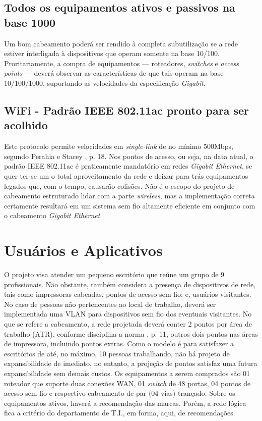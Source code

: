 \documentclass[	DIV=calc,%
							paper=a4,%
							fontsize=12pt,%
							onecolumn]{scrartcl}	 					%
\begin{document}
\subsection{Todos os equipamentos ativos e passivos na base 1000}
Um bom cabeamento poderá ser rendido à completa subutilização se a rede estiver interligada à dispositivos que operam somente na base 10/100. Proritariamente, a compra de equipamentos --- roteadores, \textit{switches} e \textit{access points} --- deverá observar as características de que tais operam na base 10/100/1000, suportando as velocidades da especificação \textit{Gigabit}.

\subsection{WiFi - Padrão IEEE 802.11ac pronto para ser acolhido}
Este protocolo permite velocidades em \textit{single-link} de no mínimo 500Mbps, segundo Perahia e Stacey \cite{perahia2013next}, p. 18. Nos pontos de acesso, ou seja, na data atual, o padrão IEEE 802.11ac é praticamente mandatório em redes \textit{Gigabit Ethernet}, se quer ter-se um o total aproveitamento da rede e deixar para trás equipamentos legados que, com o tempo, causarão colisões. Não é o escopo do projeto de cabeamento estruturado lidar com a parte \textit{wireless}, mas a implementação correta certamente resultará em um sistema sem fio altamente eficiente em conjunto com o cabeamento \textit{Gigabit Ethernet}.


\section{Usuários e Aplicativos}
O projeto visa atender um pequeno escritório que reúne um grupo de 9 profissionais. Não obstante, também considera a presença de dispositivos de rede, tais como impressoras cabeadas, pontos de acesso sem fio; e, usuários visitantes. No caso de pessoas não pertencentes ao local de trabalho, deverá ser implementada uma VLAN para dispositivos sem fio dos eventuais visitantes. No que se refere a cabeamento, a rede projetada deverá conter 2 pontos por área de trabalho (ATR), conforme disciplina a norma \cite{abnt14565}, p. 11, outros dois pontos nas áreas de impressora, incluindo pontos extras. Como o modelo é para satisfazer a escritórios de até, no máximo, 10 pessoas trabalhando, não há projeto de expansibilidade de imediato, no entanto, a projeção de pontos satisfaz uma futura expansibilidade sem demais custos. Os equipamentos a serem comprados são 01 roteador que suporte duas conexões WAN, 01 \textit{switch} de 48 portas, 04 pontos de acesso sem fio e respectivo cabeamento de par (04 vias) trançado. Sobre os equipamentos ativos, haverá a recomendação das marcas. Porém, a rede lógica fica a critério do departamento de T.I., em forma, aqui, de recomendações.
\end{document}
